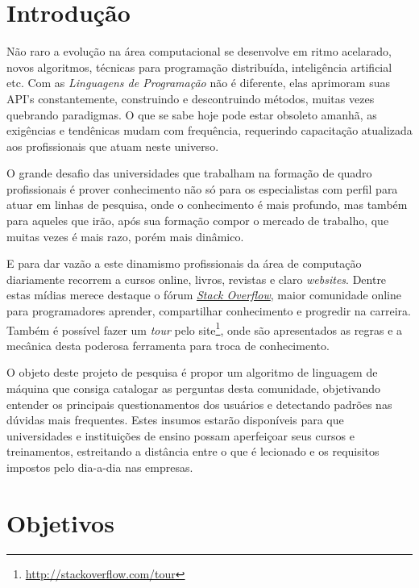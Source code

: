 \documentclass[
	12pt,				%
	openright,		%
	twoside,			%
	a4paper,			%
	english,				%
	french,				%
	spanish,			%
	brazil,				%
	]{abntex2}
\begin{document}
\chapter*[Introdução]{Introdução}

Não raro a evolução na área computacional se desenvolve em ritmo acelarado, novos algoritmos, técnicas para programação distribuída, inteligência artificial etc. Com as \emph{Linguagens de Programação} não é diferente, elas aprimoram suas API's constantemente, construindo e descontruindo métodos, muitas vezes quebrando paradigmas. O que se sabe hoje pode estar obsoleto amanhã, as exigências e tendênicas mudam com frequência, requerindo capacitação atualizada aos profissionais que atuam neste universo.  

O grande desafio das universidades que trabalham na formação de quadro profissionais é prover conhecimento não só para os especialistas com perfil para atuar em linhas de pesquisa, onde o conhecimento é mais profundo, mas também para aqueles que irão, após sua formação compor o mercado de trabalho, que muitas vezes é mais razo, porém mais dinâmico.

E para dar vazão a este dinamismo profissionais da área de computação diariamente recorrem a cursos online, livros, revistas e claro \textit{websites}. Dentre estas mídias merece destaque o fórum \href{http://stackoverflow.com/company/about}{\textit{Stack Overflow}}, maior comunidade online para programadores aprender, compartilhar conhecimento e progredir na carreira. Também é possível fazer um \textit{tour} pelo site\footnote{\url{http://stackoverflow.com/tour}}, onde são apresentados as regras e a mecânica desta poderosa ferramenta para troca de conhecimento.

O objeto deste projeto de pesquisa é propor um algoritmo de linguagem de máquina que consiga catalogar as perguntas desta comunidade, objetivando entender os principais questionamentos dos usuários e detectando padrões nas dúvidas mais frequentes. Estes insumos estarão disponíveis para que universidades e instituições de ensino possam aperfeiçoar seus cursos e treinamentos, estreitando a distância entre o que é lecionado e os requisitos impostos pelo dia-a-dia nas empresas.

\chapter{Objetivos}
\end{document}
